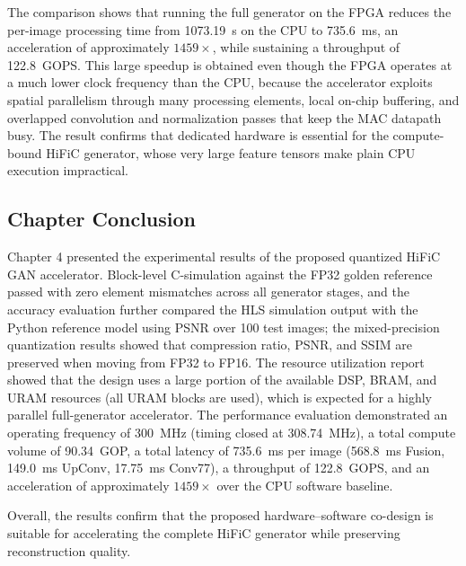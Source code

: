 The comparison shows that running the full generator on the FPGA reduces the per-image processing time from 1073.19~s on the CPU to 735.6~ms, an acceleration of approximately $1459\times$, while sustaining a throughput of 122.8~GOPS. This large speedup is obtained even though the FPGA operates at a much lower clock frequency than the CPU, because the accelerator exploits spatial parallelism through many processing elements, local on-chip buffering, and overlapped convolution and normalization passes that keep the MAC datapath busy. The result confirms that dedicated hardware is essential for the compute-bound HiFiC generator, whose very large feature tensors make plain CPU execution impractical.


\subsection{Chapter Conclusion}

Chapter 4 presented the experimental results of the proposed quantized HiFiC GAN accelerator. Block-level C-simulation against the FP32 golden reference passed with zero element mismatches across all generator stages, and the accuracy evaluation further compared the HLS simulation output with the Python reference model using PSNR over 100 test images; the mixed-precision quantization results showed that compression ratio, PSNR, and SSIM are preserved when moving from FP32 to FP16. The resource utilization report showed that the design uses a large portion of the available DSP, BRAM, and URAM resources (all URAM blocks are used), which is expected for a highly parallel full-generator accelerator. The performance evaluation demonstrated an operating frequency of 300~MHz (timing closed at 308.74~MHz), a total compute volume of 90.34~GOP, a total latency of 735.6~ms per image (568.8~ms Fusion, 149.0~ms UpConv, 17.75~ms Conv77), a throughput of 122.8~GOPS, and an acceleration of approximately $1459\times$ over the CPU software baseline.

Overall, the results confirm that the proposed hardware--software co-design is suitable for accelerating the complete HiFiC generator while preserving reconstruction quality.
